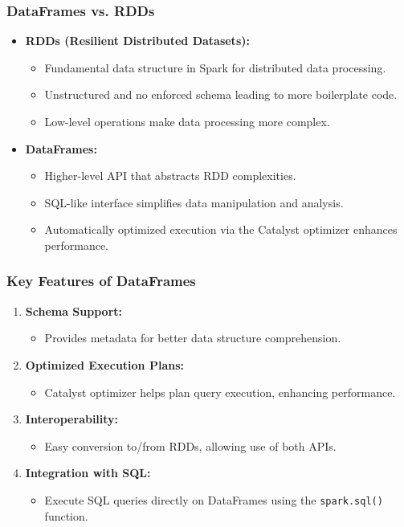 \documentclass{beamer}
\begin{document}
\begin{frame}[fragile]
    \frametitle{DataFrames vs. RDDs}
    \begin{itemize}
        \item \textbf{RDDs (Resilient Distributed Datasets):}
        \begin{itemize}
            \item Fundamental data structure in Spark for distributed data processing.
            \item Unstructured and no enforced schema leading to more boilerplate code.
            \item Low-level operations make data processing more complex.
        \end{itemize}
        
        \item \textbf{DataFrames:}
        \begin{itemize}
            \item Higher-level API that abstracts RDD complexities.
            \item SQL-like interface simplifies data manipulation and analysis.
            \item Automatically optimized execution via the Catalyst optimizer enhances performance.
        \end{itemize}
    \end{itemize}
\end{frame}

\begin{frame}[fragile]
    \frametitle{Key Features of DataFrames}
    \begin{enumerate}
        \item \textbf{Schema Support:}
        \begin{itemize}
            \item Provides metadata for better data structure comprehension.
        \end{itemize}
        
        \item \textbf{Optimized Execution Plans:}
        \begin{itemize}
            \item Catalyst optimizer helps plan query execution, enhancing performance.
        \end{itemize}
        
        \item \textbf{Interoperability:}
        \begin{itemize}
            \item Easy conversion to/from RDDs, allowing use of both APIs.
        \end{itemize}
        
        \item \textbf{Integration with SQL:}
        \begin{itemize}
            \item Execute SQL queries directly on DataFrames using the \texttt{spark.sql()} function.
        \end{itemize}
    \end{enumerate}
\end{frame}
\end{document}
